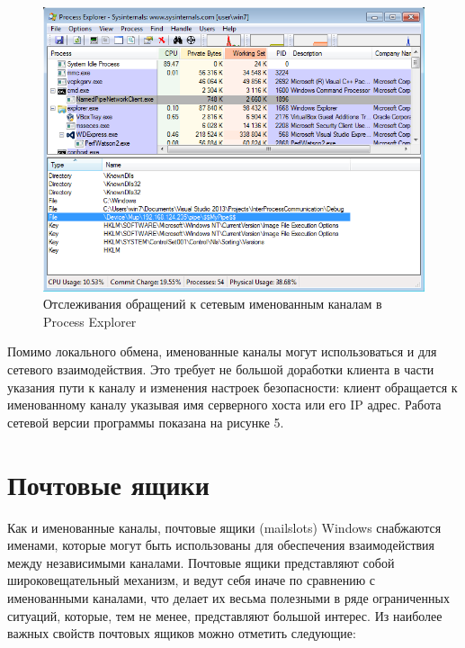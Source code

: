 \documentclass[a4paper, 12pt]{report}		%
\begin{document}
\begin{figure}[h!]
\centering
\includegraphics[scale=0.8]{res/05_Process_Explorer_npn}
\caption{Отслеживания обращений к сетевым именованным каналам в Process Explorer}
\end{figure}

Помимо локального обмена, именованные каналы могут использоваться и для сетевого взаимодействия. Это требует не большой доработки клиента в части указания пути к каналу и изменения настроек безопасности: клиент обращается к именованному каналу указывая имя серверного хоста или его IP адрес\cite{Dushutina}. Работа сетевой версии программы показана на рисунке 5. 

\chapter*{Почтовые ящики}

Как и именованные каналы, почтовые ящики (mailslots) Windows снабжаются именами, которые могут быть использованы для обеспечения взаимодействия между независимыми каналами\cite{Hart}. Почтовые ящики представляют собой широковещательный механизм, и ведут себя иначе по сравнению с именованными каналами, что делает их весьма полезными в ряде ограниченных ситуаций, которые, тем не менее, представляют большой интерес. Из наиболее важных свойств почтовых ящиков можно отметить следующие:
\end{document}
